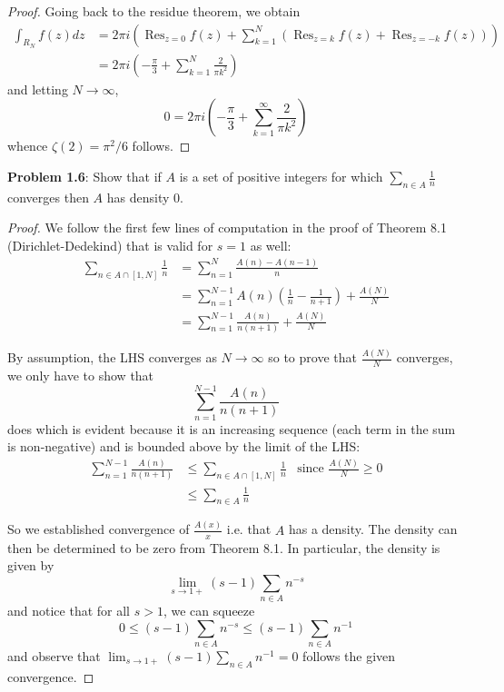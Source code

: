 \documentclass{article}
\DeclareMathOperator*{\Res}{Res}
\begin{document}
\begin{proof}
Going back to the residue theorem, we obtain
\begin{align*}
\int_{R_N} f(z) dz &= 2 \pi i \left(\Res_{z = 0} f(z) + \sum_{k = 1}^{N} (\Res_{z = k} f(z) + \Res_{z = -k} f(z)) \right)\\
&= 2 \pi i \left(-\frac{\pi}{3} + \sum_{k = 1}^{N} \frac{2}{\pi k^2} \right)
\end{align*}
and letting $N \rightarrow \infty$,
$$0 = 2 \pi i \left(-\frac{\pi}{3} + \sum_{k = 1}^{\infty} \frac{2}{\pi k^2} \right)$$
whence $\zeta(2) = \pi^2/6$ follows.
\end{proof}

\textbf{Problem 1.6}: Show that if $A$ is a set of positive integers for which $\sum_{n \in A} \frac{1}{n}$ converges then $A$ has density 0.

\begin{proof}
We follow the first few lines of computation in the proof of Theorem 8.1 (Dirichlet-Dedekind) that is valid for $s = 1$ as well:
\begin{align*}
\sum_{n \in A \cap [1, N]} \frac{1}{n} &= \sum_{n = 1}^{N} \frac{A(n) - A(n-1)}{n}\\
&= \sum_{n = 1}^{N - 1} A(n) \left(\frac{1}{n} - \frac{1}{n+1}\right) + \frac{A(N)}{N}\\
&= \sum_{n = 1}^{N - 1} \frac{A(n)}{n(n+1)} + \frac{A(N)}{N}
\end{align*}

By assumption, the LHS converges as $N \rightarrow \infty$ so to prove that $\frac{A(N)}{N}$ converges, we only have to show that
$$\sum_{n = 1}^{N - 1} \frac{A(n)}{n(n+1)}$$
does which is evident because it is an increasing sequence (each term in the sum is non-negative) and is bounded above by the limit of the LHS:
\begin{align*}
\sum_{n = 1}^{N - 1} \frac{A(n)}{n(n+1)} &\leq \sum_{n \in A \cap [1, N]} \frac{1}{n} &\text{since } \frac{A(N)}{N} \geq 0\\
&\leq \sum_{n \in A} \frac{1}{n}
\end{align*}

So we established convergence of $\frac{A(x)}{x}$ i.e. that $A$ has a density. The density can then be determined to be zero from Theorem 8.1. In particular, the density is given by
$$\lim_{s \rightarrow 1+} (s-1) \sum_{n \in A} n^{-s}$$
and notice that for all $s > 1$, we can squeeze
$$0 \leq (s-1) \sum_{n \in A} n^{-s} \leq (s - 1) \sum_{n \in A} n^{-1}$$
and observe that $\lim_{s \rightarrow 1+} (s - 1) \sum_{n \in A} n^{-1} = 0$ follows the given convergence.
\end{proof}

\unless\ifdefined\IsMainDocument
\end{document}
